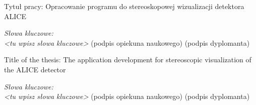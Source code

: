 




\newpage
\thispagestyle{empty}
\phantom{Nothing here}
\newpage
\clearpage
\phantom{Here neither}

\setcounter{page}{3}
\vspace{-1.5cm}
\begin{flushleft}
	Tytuł pracy: Opracowanie programu do stereoskopowej wizualizacji detektora ALICE 
\end{flushleft}
\vspace{0.5cm}
\vspace{0.5cm}
\noindent \textit{Słowa kluczowe: \\ <tu wpisz słowa kluczowe>} 
\vfill
(podpis opiekuna naukowego) \hfill (podpis dyplomanta)

\newpage
\thispagestyle{empty}
\phantom{Nothing here}
\newpage
\clearpage
\phantom{Here neither}

\setcounter{page}{5}
\vspace{-1.5cm}
\begin{flushleft}
	Title of the thesis: The application development for stereoscopic visualization of the ALICE detector
\end{flushleft}
\vspace{0.5cm}
\vspace{0.5cm}
\noindent \textit{Słowa kluczowe: \\ <tu wpisz słowa kluczowe>} 
\vfill
(podpis opiekuna naukowego) \hfill (podpis dyplomanta)

\newpage
\thispagestyle{empty}
\phantom{Nothing here}
\newpage
\clearpage

\setcounter{page}{7}


\newpage
\thispagestyle{empty}
\phantom{Nothing here}
\newpage
\clearpage

